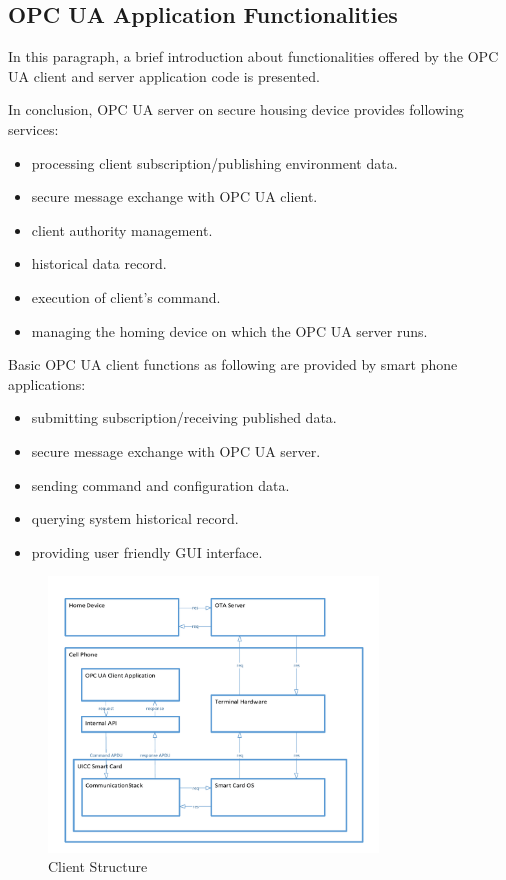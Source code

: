 \subsection{OPC UA Application Functionalities}\label{secFunction}
In this paragraph, a brief introduction about functionalities offered by  the OPC UA  client and server application code is presented.

In conclusion, OPC UA server on secure housing device provides following services:
 \begin{itemize}
  \item processing client subscription/publishing environment data.
  \item secure message exchange with OPC UA client.
  \item client authority management.
  \item historical data record.
  \item execution of client's command.
  \item managing the homing device on which the OPC UA server runs.
\end{itemize}
Basic OPC UA client functions as following are provided by smart phone applications:
 \begin{itemize}
  \item submitting subscription/receiving published data.
  \item secure message exchange with OPC UA server.
  \item sending command and configuration data.
  \item querying system historical record.
  \item providing user friendly GUI interface.
\end{itemize}


 \begin{figure}[!htb]
	\centering
	\includegraphics[width=0.78\textwidth]{clientStructure}
		\caption{Client Structure}
	\label{fig:clientStructure}
\end{figure}

